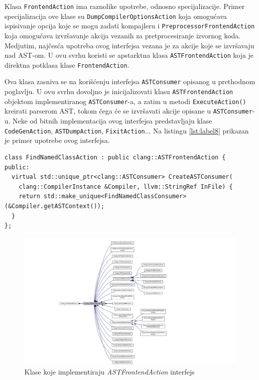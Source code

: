 \documentclass[12pt,oneside]{memoir}
\begin{document}
Klasa \lstinline{FrontendAction} ima raznolike upotrebe, odnosno specijalizacije. Primer specijalizacija ove klase su \lstinline{DumpCompilerOptionsAction}
koja omogu\'{c}ava ispisivanje opcija koje se mogu zadati kompajleru i \lstinline{PreprocessorFrontendAction} koja omogu\'{c}ava izvr\v{s}avanje akcija vezanih za pretprocesiranje izvornog koda. Medjutim, naj\v{c}es\'{c}a upotreba ovog interfejsa vezana je za akcije koje se izvr\v{s}avaju nad AST-om. U ovu svrhu koristi se apstarktna klasa \lstinline{ASTFrontendAction} koja je direktna potklasa klase \lstinline{FrontendAction}. \par
Ova klasa zasniva se na kori\v{s}\'{c}enju interfejsa \lstinline{ASTConsumer} opisanog u prethodnom poglavlju. U ovu svrhu dovoljno je inicijalizovati klasu \lstinline{ASTFrontendAction} objektom implementiranog \lstinline{ASTConsumer}-a, a zatim u metodi \lstinline{ExecuteAction()} kreirati parserom AST,
tokom \v{c}ega \'{c}e se izvr\v{s}avati akcije opisane u \lstinline{ASTConsumer}-u. Neke od bitnih implementacija ovog interfejsa predstavljaju klase \lstinline{CodeGenAction}, \lstinline{ASTDumpAction}, \lstinline{FixitAction}...  Na listingu \ref{lst:label8} prikazan je primer upotrebe ovog interfejsa. 
\\
\begin{lstlisting}[caption={Primer upotrebe klase \lstinline{ASTFrontendAction} interfejsa}, label=lst:label8, captionpos=b]
class FindNamedClassAction : public clang::ASTFrontendAction {
public:
  virtual std::unique_ptr<clang::ASTConsumer> CreateASTConsumer(
    clang::CompilerInstance &Compiler, llvm::StringRef InFile) {
    return std::make_unique<FindNamedClassConsumer>(&Compiler.getASTContext());
  }
};

\end{lstlisting}


\begin{figure}[h!]
\begin{center}
\includegraphics[scale=0.4]{ASTFrontendAction.png}
\end{center}
\caption{Klase koje implementiraju \textit{ASTFrontendAction} interfejs}
\label{fig:exploded}
\end{figure}
\end{document}
